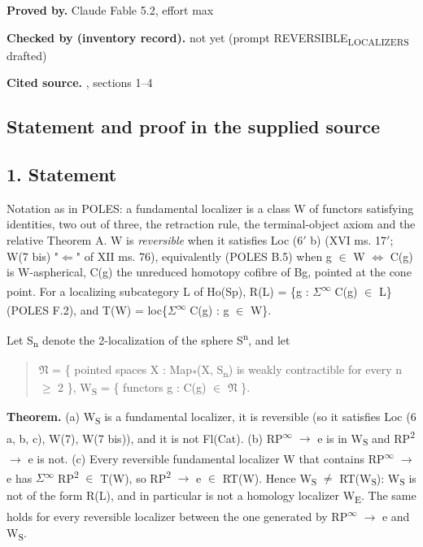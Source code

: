 \noindent\textbf{Proved by.} Claude Fable 5.2, effort max\par

\noindent\textbf{Checked by (inventory record).} not yet (prompt REVERSIBLE\textsubscript{LOCALIZERS} drafted)\par\smallskip

\noindent\textbf{Cited source.} , sections 1--4\par\medskip

\subsection*{Statement and proof in the supplied source}

\subsection*{1. Statement}

Notation as in POLES: a fundamental localizer is a class W of functors satisfying identities, two out of three, the retraction rule, the terminal-object axiom and the relative Theorem A. W is \emph{reversible} when it satisfies Loc (6\ensuremath{\prime} b) (XVI ms. 17\ensuremath{\prime}; W(7 bis) "\ensuremath{\Leftarrow}" of XII ms. 76), equivalently (POLES B.5) when g \ensuremath{\in} W \ensuremath{\Leftrightarrow} C(g) is W-aspherical, C(g) the unreduced homotopy cofibre of Bg, pointed at the cone point. For a localizing subcategory L of Ho(Sp), R(L) = \{g : \ensuremath{\Sigma}\textsuperscript{\ensuremath{\infty}} C(g) \ensuremath{\in} L\} (POLES F.2), and T(W) = loc\{\ensuremath{\Sigma}\textsuperscript{\ensuremath{\infty}} C(g) : g \ensuremath{\in} W\}.

Let S\textsubscript{n} denote the 2-localization of the sphere S\textsuperscript{n}, and let

\begin{quote}
\ensuremath{\mathfrak N} = \{ pointed spaces X : Map\textsubscript{*}(X, S\textsubscript{n}) is weakly contractible for every n \ensuremath{\geq} 2 \},
W\textsubscript{S} = \{ functors g : C(g) \ensuremath{\in} \ensuremath{\mathfrak N} \}.
\end{quote}

\textbf{Theorem.} (a) W\textsubscript{S} is a fundamental localizer, it is reversible (so it satisfies Loc (6 a, b, c), W(7), W(7 bis)), and it is not Fl(Cat). (b) RP\textsuperscript{\ensuremath{\infty}} \ensuremath{\to} e is in W\textsubscript{S} and RP\textsuperscript{2} \ensuremath{\to} e is not. (c) Every reversible fundamental localizer W that contains RP\textsuperscript{\ensuremath{\infty}} \ensuremath{\to} e has \ensuremath{\Sigma}\textsuperscript{\ensuremath{\infty}} RP\textsuperscript{2} \ensuremath{\in} T(W), so RP\textsuperscript{2} \ensuremath{\to} e \ensuremath{\in} RT(W). Hence W\textsubscript{S} \ensuremath{\ne} RT(W\textsubscript{S}): W\textsubscript{S} is not of the form R(L), and in particular is not a homology localizer W\textsubscript{E}. The same holds for every reversible localizer between the one generated by RP\textsuperscript{\ensuremath{\infty}} \ensuremath{\to} e and W\textsubscript{S}.


